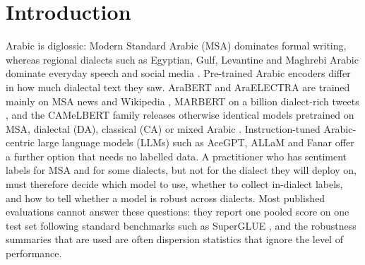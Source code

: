 \documentclass[11pt]{article}
\begin{document}
\section{Introduction}
\label{sec:intro}
Arabic is diglossic: Modern Standard Arabic (MSA) dominates formal writing, whereas regional dialects such as Egyptian, Gulf, Levantine and Maghrebi Arabic dominate everyday speech and social media \cite{ref1,ref7}. Pre-trained Arabic encoders differ in how much dialectal text they saw. AraBERT and AraELECTRA are trained mainly on MSA news and Wikipedia \cite{antoun2020arabert,antoun2021araelectra}, MARBERT on a billion dialect-rich tweets \cite{abdulmageed2021arbert}, and the CAMeLBERT family releases otherwise identical models pretrained on MSA, dialectal (DA), classical (CA) or mixed Arabic \cite{inoue2021interplay}. Instruction-tuned Arabic-centric large language models (LLMs) such as AceGPT, ALLaM and Fanar \cite{huang2024acegpt,bari2025allam,fanar2025} offer a further option that needs no labelled data. A practitioner who has sentiment labels for MSA and for some dialects, but not for the dialect they will deploy on, must therefore decide which model to use, whether to collect in-dialect labels, and how to tell whether a model is robust across dialects. Most published evaluations cannot answer these questions: they report one pooled score on one test set following standard benchmarks such as SuperGLUE \cite{wang2019superglue}, and the robustness summaries that are used are often dispersion statistics that ignore the level of performance.
\end{document}
